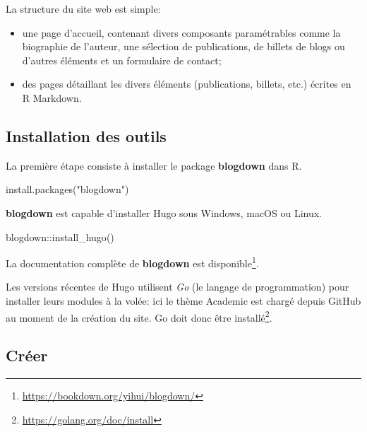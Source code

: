 \documentclass[
  11pt,
  french,
  a4paper,
  extrafontsizes,onecolumn,openright
  ]{memoir}
\newenvironment{Shaded}{\begin{snugshade}}{\end{snugshade}}
\newcommand{\FunctionTok}[1]{\textcolor[rgb]{0.00,0.00,0.00}{#1}}
\newcommand{\NormalTok}[1]{#1}
\newcommand{\SpecialCharTok}[1]{\textcolor[rgb]{0.00,0.00,0.00}{#1}}
\newcommand{\StringTok}[1]{\textcolor[rgb]{0.31,0.60,0.02}{#1}}
\providecommand{\tightlist}{%
  \setlength{\itemsep}{0pt}\setlength{\parskip}{0pt}}
\begin{document}
La structure du site web est simple:

\begin{itemize}
\tightlist
\item
  une page d'accueil, contenant divers composants paramétrables comme la biographie de l'auteur, une sélection de publications, de billets de blogs ou d'autres éléments et un formulaire de contact;
\item
  des pages détaillant les divers éléments (publications, billets, etc.) écrites en R Markdown.
\end{itemize}

\hypertarget{installation-des-outils}{%
\subsection{Installation des outils}\label{installation-des-outils}}

La première étape consiste à installer le package \textbf{blogdown} dans R.

\scriptsize

\begin{Shaded}
\begin{Highlighting}[]
\FunctionTok{install.packages}\NormalTok{(}\StringTok{"blogdown"}\NormalTok{)}
\end{Highlighting}
\end{Shaded}

\normalsize

\textbf{blogdown} est capable d'installer Hugo sous Windows, macOS ou Linux.

\scriptsize

\begin{Shaded}
\begin{Highlighting}[]
\NormalTok{blogdown}\SpecialCharTok{::}\FunctionTok{install\_hugo}\NormalTok{()}
\end{Highlighting}
\end{Shaded}

\normalsize

La documentation complète de \textbf{blogdown} est disponible\footnote{\url{https://bookdown.org/yihui/blogdown/}}.

Les versions récentes de Hugo utilisent \emph{Go} (le langage de programmation) pour installer leurs modules à la volée: ici le thème Academic est chargé depuis GitHub au moment de la création du site.
Go doit donc être installé\footnote{\url{https://golang.org/doc/install}}.

\hypertarget{cruxe9er-2}{%
\subsection{Créer}\label{cruxe9er-2}}
\end{document}

